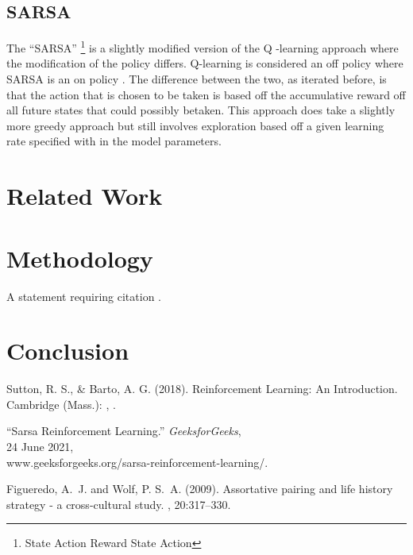 \documentclass[twoside,twocolumn]{article}
\begin{document}
\subsection{SARSA}

\indent The “SARSA” \footnote{State Action Reward State Action} is a slightly modified version of the Q -learning approach where the modification of the policy differs. Q-learning is considered an off policy where SARSA is an on policy \cite{GeeksforGeeks:2021dg}.  The difference between the two, as iterated before, is that the action that is chosen to be taken is based off the accumulative reward off all future states that could possibly betaken.  This approach does take a slightly more greedy approach but still involves exploration based off a given learning rate specified with in the model parameters. 


\section{Related Work}


\section{Methodology}

A statement requiring citation \cite{Figueredo:2009dg}.


\section{Conclusion}

\pagebreak



\begin{thebibliography}{99} %
Sutton, R. S., \& Barto, A. G. (2018).
\newblock Reinforcement Learning: An Introduction. Cambridge (Mass.): 
, .

“Sarsa Reinforcement Learning.” {\em GeeksforGeeks}, \\
24 June 2021,\\
\newblock www.geeksforgeeks.org/sarsa-reinforcement-learning/. 


Figueredo, A.~J. and Wolf, P. S.~A. (2009).
\newblock Assortative pairing and life history strategy - a cross-cultural
  study.
, 20:317--330.
\end{thebibliography}

\end{document}
